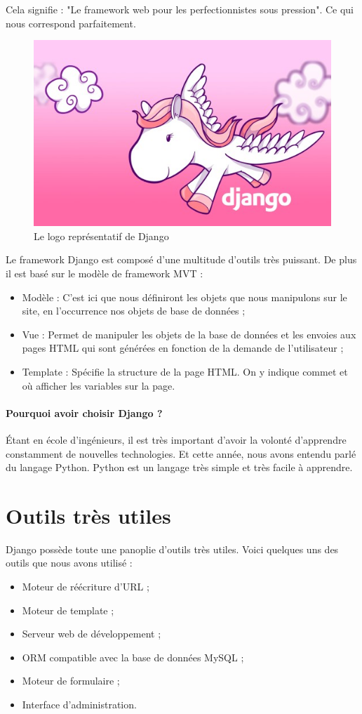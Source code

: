 \documentclass[twoside,UTF8]{EPURapport}
\begin{document}
Cela signifie : "Le framework web pour les perfectionnistes sous pression". Ce qui nous correspond parfaitement.

\begin{figure}[H]
 \centering
 \includegraphics[width=0.5\linewidth]{./logos/pony.jpg}
 \caption{Le logo représentatif de Django}
\end{figure}

Le framework Django est composé d'une multitude d'outils très puissant. De plus il est basé sur le modèle de framework MVT :
\begin{itemize}
    \item Modèle : C'est ici que nous définiront les objets que nous manipulons sur le site, en l'occurrence nos objets de base de données ;
    \item Vue : Permet de manipuler les objets de la base de données et les envoies aux pages HTML qui sont générées en fonction de la demande de l'utilisateur ;
    \item Template : Spécifie la structure de la page HTML. On y indique commet et où afficher les variables sur la page.
\end{itemize}

\paragraph{Pourquoi avoir choisir Django ?} Étant en école d'ingénieurs, il est très important d'avoir la volonté d'apprendre constamment de nouvelles technologies. Et cette année, nous avons entendu parlé du langage Python. Python est un langage très simple et très facile à apprendre.



\section{Outils très utiles}
Django possède toute une panoplie d'outils très utiles. Voici quelques uns des outils que nous avons utilisé :
\begin{itemize}
    \item Moteur de réécriture d'URL ;
    \item Moteur de template ;
    \item Serveur web de développement ;
    \item ORM compatible avec la base de données MySQL ;
    \item Moteur de formulaire ;
    \item Interface d'administration.
\end{itemize}
\end{document}
